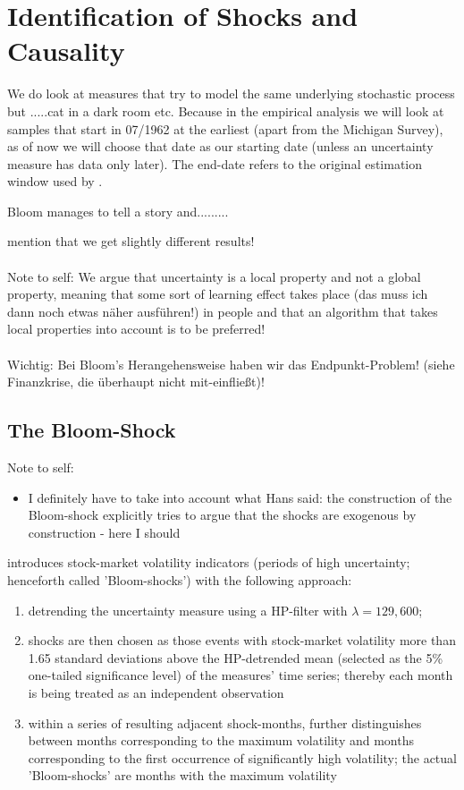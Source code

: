 \documentclass[a4paper,11pt,listof=nochaptergap,oneside,pointednumbers,bibtotoc,bigheadings,liststotoc]{scrbook}
\begin{document}
\section{Identification of Shocks and Causality}
We do look at measures that try to model the same underlying stochastic process but .....cat in a dark room etc.
Because in the empirical analysis we will look at samples that start in 07/1962 at the earliest (apart from the Michigan Survey), as of now we will choose that date as our starting date (unless an uncertainty measure has data only later). The end-date refers to the original estimation window used by \citet{bloom:09}.


Bloom manages to tell a story and.........

mention that we get slightly different results!
\\
\\Note to self: We argue that uncertainty is a local property and not a global property, meaning that some sort of learning effect takes place (das muss ich dann noch etwas näher ausführen!) in people and that an algorithm that takes local properties
into account is to be preferred!
\\
\\
Wichtig: Bei Bloom's Herangehensweise haben wir das Endpunkt-Problem! (siehe Finanzkrise, die überhaupt nicht mit-einfließt)!


\subsection{The Bloom-Shock}
\label{sec:bloom_shock}
\begingroup
    \fontsize{8pt}{12pt}\selectfont
    Note to self:
\begin{itemize}
	\item I definitely have to take into account what Hans said: the construction of the Bloom-shock explicitly tries to argue that the shocks are exogenous by construction - here I should 
\end{itemize}
\endgroup


\citet{bloom:09} introduces stock-market volatility indicators (periods of high uncertainty; henceforth called 'Bloom-shocks') with the following approach:
\begin{enumerate}[i]
	\item detrending the uncertainty measure using a HP-filter with $\lambda = 129,600$; 
	\item shocks are then chosen as those events with stock-market volatility more than 1.65 standard deviations above the HP-detrended mean (selected as the 5\% one-tailed significance level) of the measures' time series; thereby each month is being treated as an independent observation
	\item within a series of resulting adjacent shock-months, \citet{bloom:09} further distinguishes between months corresponding to the maximum volatility and months corresponding to the first occurrence of significantly high volatility; the actual 'Bloom-shocks' are months with the maximum volatility
\end{enumerate}
\end{document}
